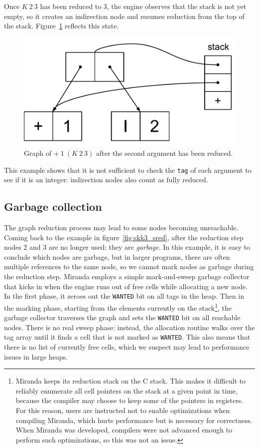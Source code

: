\documentclass[conference]{IEEEtran}
\begin{document}
Once $K \ 2 \ 3$ has been reduced to $3$, the engine observes that the stack is not yet empty, so it creates an indirection node and resumes reduction from the top of the stack.
Figure~\ref{fig:add_step2} reflects this state.

\begin{figure}
    \includegraphics[width=.8\columnwidth]{add_step2}
    \centering
    \caption{
        Graph of $+ \ 1 \ (K \ 2 \ 3)$ after the second argument has been reduced.
    }
    \label{fig:add_step2}
\end{figure}

This example shows that it is not sufficient to check the \texttt{tag} of each argument to see if it is an integer: indirection nodes also count as fully reduced.

\subsection{Garbage collection}
The graph reduction process may lead to some nodes becoming unreachable.
Coming back to the example in figure~\ref{fig:skk3_sred}, after the reduction step nodes 2 and 3 are no longer used: they are \textit{garbage}.
In this example, it is easy to conclude which nodes are garbage, but in larger programs, there are often multiple references to the same node, so we cannot mark nodes as garbage during the reduction step.
Miranda employs a simple mark-and-sweep garbage collector that kicks in when the engine runs out of free cells while allocating a new node.
In the first phase, it zeroes out the \texttt{WANTED} bit on all tags in the heap.
Then in the marking phase, starting from the elements currently on the stack\footnote{
    Miranda keeps its reduction stack on the C stack.
    This makes it difficult to reliably enumerate all cell pointers on the stack at a given point in time, because the compiler may choose to keep some of the pointers in registers.
    For this reason, users are instructed not to enable optimizations when compiling Miranda, which hurts performance but is necessary for correctness.
    When Miranda was developed, compilers were not advanced enough to perform such optimizations, so this was not an issue.
}, the garbage collector traverses the graph and sets the \texttt{WANTED} bit on all reachable nodes.
There is no real sweep phase: instead, the allocation routine walks over the tag array until it finds a cell that is not marked as \texttt{WANTED}.
This also means that there is no list of currently free cells, which we suspect may lead to performance issues in large heaps.
\end{document}
